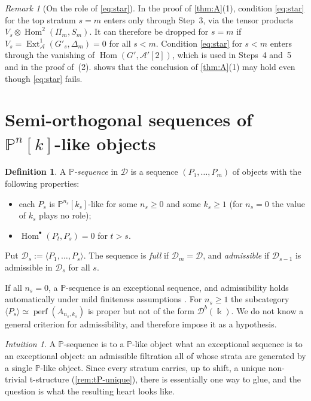 \documentclass[11pt,reqno]{amsart}
\theoremstyle{plain}
\theoremstyle{definition}
\newtheorem{definition}[theorem]{Definition}
\theoremstyle{remark}
\newtheorem{remark}[theorem]{Remark}
\newtheorem*{intuition}{Intuition}
\newcommand{\kk}{\Bbbk}
\DeclareMathOperator{\Hom}{Hom}
\DeclareMathOperator{\Ext}{Ext}
\newcommand{\Db}{\mathcal{D}^b}
\newcommand{\thick}[1]{\langle #1\rangle}
\newcommand{\Pn}[2]{\mathbb{P}^{#1}[#2]}
\newcommand{\cD}{\mathcal{D}}
\newcommand{\cA}{\mathcal{A}}
\begin{document}
\begin{remark}[On the role of \eqref{eq:star}]\label{rem:star}
In the proof of \cref{thm:A}(1), condition \eqref{eq:star} for the top stratum $s=m$ enters only through Step~3, via the tensor products $V_s\otimes\Hom^2(\Pi_m,S_m)$. It can therefore be dropped for $s=m$ if $V_s=\Ext^1_\cA(G'_s,\Delta_m)=0$ for all $s<m$. Condition \eqref{eq:star} for $s<m$ enters through the vanishing of $\Hom(G',\cA'[2])$, which is used in Steps~4 and~5 and in the proof of~(2).  shows that the conclusion of \cref{thm:A}(1) may hold even though \eqref{eq:star} fails.
\end{remark}

\section{Semi-orthogonal sequences of \texorpdfstring{$\mathbb{P}^n[k]$}{Pn[k]}-like objects}\label{sec:P-sequences}

\begin{definition}\label{def:P-sequence}
A \emph{$\mathbb{P}$-sequence} in $\cD$ is a sequence $(P_1,\dots,P_m)$ of objects with the following properties:
\begin{itemize}
\item each $P_s$ is $\Pn{n_s}{k_s}$-like for some $n_s\ge0$ and some $k_s\ge1$ (for $n_s=0$ the value of $k_s$ plays no role);
\item $\Hom^\bullet(P_t,P_s)=0$ for $t>s$.
\end{itemize}
Put $\cD_s:=\thick{P_1,\dots,P_s}$. The sequence is \emph{full} if $\cD_m=\cD$, and \emph{admissible} if $\cD_{s-1}$ is admissible in $\cD_s$ for all $s$.
\end{definition}

If all $n_s=0$, a $\mathbb{P}$-sequence is an exceptional sequence, and admissibility holds automatically under mild finiteness assumptions \cite{Bon89}. For $n_s\ge1$ the subcategory $\thick{P_s}\simeq\operatorname{perf}(A_{n_s,k_s})$ is proper but not of the form $\Db(\kk)$. We do not know a general criterion for admissibility, and therefore impose it as a hypothesis.

\begin{intuition}
A $\mathbb{P}$-sequence is to a $\mathbb{P}$-like object what an exceptional sequence is to an exceptional object: an admissible filtration all of whose strata are generated by a single $\mathbb{P}$-like object. Since every stratum carries, up to shift, a unique non-trivial t-structure (\cref{rem:tP-unique}), there is essentially one way to glue, and the question is what the resulting heart looks like.
\end{intuition}
\end{document}
